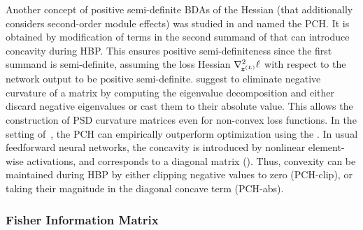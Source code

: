 Another concept of positive semi-definite BDAs of the Hessian (that additionally
considers second-order module effects) was studied in \citet{wei2018bdapch} and
named the PCH. It is obtained by modification of terms in the second summand of
 that can introduce concavity during HBP.
This ensures positive semi-definiteness since the first summand is
semi-definite, assuming the loss Hessian $\nabla_{\!{{\bm{z}}^{(L)}}}^{2}\ell$ with
respect to the network output to be positive semi-definite.
\citet{wei2018bdapch} suggest to eliminate negative curvature of a matrix by
computing the eigenvalue decomposition and either discard negative eigenvalues
or cast them to their absolute value. This allows the construction of PSD
curvature matrices even for non-convex loss functions. In the setting
of~\citet{wei2018bdapch}, the PCH can empirically outperform optimization using
the \ggn. In usual feedforward neural networks, the concavity is introduced by
nonlinear element-wise activations, and corresponds to a diagonal matrix
(). Thus, convexity can be maintained during
HBP by either clipping negative values to zero (PCH-clip), or taking their
magnitude in the diagonal concave term (PCH-abs).

\subsubsection{Fisher Information Matrix}

